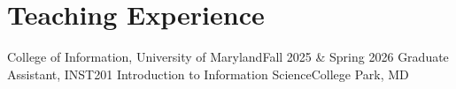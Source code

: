 \section{Teaching Experience}
\resumeSubHeadingListStart

    \resumeSubheading
    {College of Information, University of Maryland}{Fall 2025 \& Spring 2026}
    {Graduate Assistant, INST201 Introduction to Information Science}{College Park, MD}


\resumeSubHeadingListEnd

